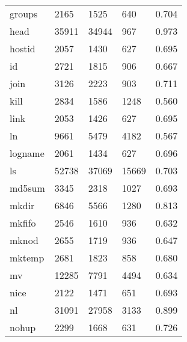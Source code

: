 \begin{longtable}{lp{3.0cm}p{3.0cm}p{3.0cm}p{3.0cm}}
groups    &                     2165 &         1525 &           640 &                    0.704 \\
head      &                    35911 &        34944 &           967 &                    0.973 \\
hostid    &                     2057 &         1430 &           627 &                    0.695 \\
id        &                     2721 &         1815 &           906 &                    0.667 \\
join      &                     3126 &         2223 &           903 &                    0.711 \\
kill      &                     2834 &         1586 &          1248 &                    0.560 \\
link      &                     2053 &         1426 &           627 &                    0.695 \\
ln        &                     9661 &         5479 &          4182 &                    0.567 \\
logname   &                     2061 &         1434 &           627 &                    0.696 \\
ls        &                    52738 &        37069 &         15669 &                    0.703 \\
md5sum    &                     3345 &         2318 &          1027 &                    0.693 \\
mkdir     &                     6846 &         5566 &          1280 &                    0.813 \\
mkfifo    &                     2546 &         1610 &           936 &                    0.632 \\
mknod     &                     2655 &         1719 &           936 &                    0.647 \\
mktemp    &                     2681 &         1823 &           858 &                    0.680 \\
mv        &                    12285 &         7791 &          4494 &                    0.634 \\
nice      &                     2122 &         1471 &           651 &                    0.693 \\
nl        &                    31091 &        27958 &          3133 &                    0.899 \\
nohup     &                     2299 &         1668 &           631 &                    0.726 \\

\end{longtable}
